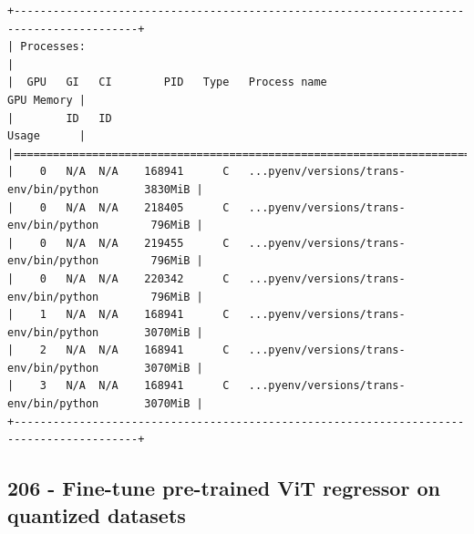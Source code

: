 \begin{verbatim}
+-----------------------------------------------------------------------------------------+
| Processes:                                                                              |
|  GPU   GI   CI        PID   Type   Process name                              GPU Memory |
|        ID   ID                                                               Usage      |
|=========================================================================================|
|    0   N/A  N/A    168941      C   ...pyenv/versions/trans-env/bin/python       3830MiB |
|    0   N/A  N/A    218405      C   ...pyenv/versions/trans-env/bin/python        796MiB |
|    0   N/A  N/A    219455      C   ...pyenv/versions/trans-env/bin/python        796MiB |
|    0   N/A  N/A    220342      C   ...pyenv/versions/trans-env/bin/python        796MiB |
|    1   N/A  N/A    168941      C   ...pyenv/versions/trans-env/bin/python       3070MiB |
|    2   N/A  N/A    168941      C   ...pyenv/versions/trans-env/bin/python       3070MiB |
|    3   N/A  N/A    168941      C   ...pyenv/versions/trans-env/bin/python       3070MiB |
+-----------------------------------------------------------------------------------------+

\end{verbatim}

\subsection{206 - Fine-tune pre-trained ViT regressor on quantized datasets}
\label{app_res:206}

